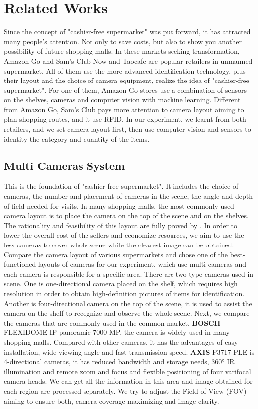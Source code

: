 \section{Related Works}
\label{sec:rw}

Since the concept of "cashier-free supermarket" was put forward, it has attracted many people's attention.
Not only to save costs, but also to show you another possibility of future shopping malls.
In these markets seeking transformation, Amazon Go and Sam's Club Now and Taocafe are popular retailers in unmanned supermarket.
All of them use the more advanced identification technology, plus their layout and the choice of camera equipment, realize the idea of "cashier-free supermarket".
For one of them, Amazon Go stores use a combination of sensors on the shelves, cameras and computer vision with machine learning.
Different from Amazon Go, Sam's Club  pays more attention to camera layout aiming to plan shopping routes, and it use RFID\cite{1192765}.
In our experiment, we learnt from both retailers, and we set camera layout first, then use computer vision and sensors to identity the category and quantity of the items.

\subsection{Multi Cameras System}

This is the foundation of "cashier-free supermarket".
It includes the choice of cameras, the number and placement of cameras in the scene, the angle and depth of field needed for visits.
In many shopping malls, the most commonly used camera layout is to place the camera on the top of the scene and on the shelves.
The rationality and feasibility of this layout are fully proved by \cite{1315006}.
In order to lower the overall cost of the sellers and economize resources, we aim to use the less cameras to cover whole scene while the clearest image can be obtained.
Compare the camera layout of various supermarkets and chose one of the best-functioned layouts of cameras for our experiment, which use multi cameras and each camera is responsible for a specific area.
There are two type cameras used in scene.
One is one-directional camera placed on the shelf, which requires high resolution in order to obtain high-definition pictures of items for identification.
Another is four-directional camera on the top of the scene, it is used to assist the camera on the shelf to recognize and observe the whole scene.
Next, we compare the cameras that are commonly used in the common market.
\textbf{BOSCH} FLEXIDOME IP panoramic 7000 MP, the camera is widely used in many shopping malls.
Compared with other cameras, it has the advantages of easy installation, wide viewing angle and fast transmission speed.
\textbf{AXIS} P3717-PLE is 4-directional cameras, it has reduced bandwidth and storage needs, 360° IR illumination and remote zoom and focus and flexible positioning of four varifocal camera heads.
We can get all the information in this area and image obtained for each region are processed separately\cite{}.
We try to adjust the Field of View (FOV) aiming to ensure both, camera coverage maximizing and image clarity\cite{ERDEM2006156}.

